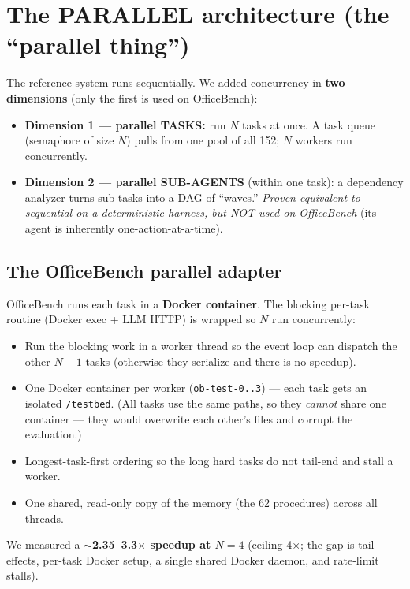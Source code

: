 \documentclass[11pt]{article}
\newcommand{\code}[1]{\texttt{#1}}
\begin{document}
\section{The PARALLEL architecture (the ``parallel thing'')}
The reference system runs sequentially. We added concurrency in \textbf{two dimensions} (only the first is
used on OfficeBench):
\begin{itemize}[leftmargin=1.4em,itemsep=1pt]
\item \textbf{Dimension 1 --- parallel TASKS:} run $N$ tasks at once. A task queue (semaphore of size $N$)
pulls from one pool of all 152; $N$ workers run concurrently.
\item \textbf{Dimension 2 --- parallel SUB-AGENTS} (within one task): a dependency analyzer turns
sub-tasks into a DAG of ``waves.'' \emph{Proven equivalent to sequential on a deterministic harness, but
NOT used on OfficeBench} (its agent is inherently one-action-at-a-time).
\end{itemize}

\subsection{The OfficeBench parallel adapter}
OfficeBench runs each task in a \textbf{Docker container}. The blocking per-task routine (Docker exec +
LLM HTTP) is wrapped so $N$ run concurrently:
\begin{itemize}[leftmargin=1.4em,itemsep=1pt]
\item Run the blocking work in a worker thread so the event loop can dispatch the other $N{-}1$ tasks
(otherwise they serialize and there is no speedup).
\item One Docker container per worker (\code{ob-test-0..3}) --- each task gets an isolated \code{/testbed}.
(All tasks use the same paths, so they \emph{cannot} share one container --- they would overwrite each
other's files and corrupt the evaluation.)
\item Longest-task-first ordering so the long hard tasks do not tail-end and stall a worker.
\item One shared, read-only copy of the memory (the 62 procedures) across all threads.
\end{itemize}
We measured a \textbf{$\sim$2.35--3.3$\times$ speedup at $N{=}4$} (ceiling 4$\times$; the gap is tail
effects, per-task Docker setup, a single shared Docker daemon, and rate-limit stalls).
\end{document}
